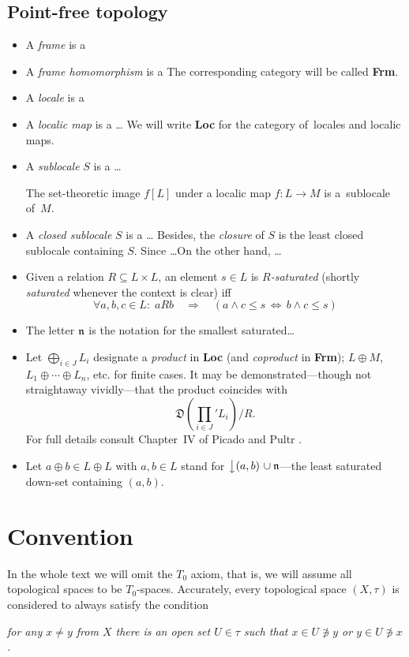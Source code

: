 \subsection*{Point-free topology}

\begin{itemize}
\item A \emph{frame} is a
\item A \emph{frame homomorphism} is a
The corresponding category will be called {\bf Frm}.
\item A \emph{locale} is a
\item A \emph{localic map} is a \ldots
We will write {\bf Loc} for the category of~locales and localic maps.
\item A \emph{sublocale} $S$ is a \ldots
  \begin{fact}
    The set-theoretic image $f[L]$ under a localic map $f\colon L\to M$
    is a~sublocale of~$M$.
  \end{fact}
\item A \emph{closed sublocale} $S$ is a \ldots
Besides, the \emph{closure} of $S$ is the least closed sublocale containing $S$.
Since \ldots On the other hand, \ldots
\item Given a relation $R\subseteq L \times L$, an element $s\in L$ is
\emph{$R$-saturated} (shortly \emph{saturated} whenever the context is clear)
  iff
\[
  \forall a, b, c\in L: \; aRb \quad \Rightarrow \quad \left( a \wedge c \leq s
  \, \Leftrightarrow \, b \wedge c \leq s \right)
\]
\item The letter $\mathfrak{n}$ is the notation for the smallest saturated\ldots
\item Let $\bigoplus_{i\in J} L_i$ designate a \emph{product} in {\bf Loc} (and
\emph{coproduct} in {\bf Frm}); $L \oplus M$, $L_1 \oplus\cdots\oplus L_n$, etc.
for finite cases.
It may be demonstrated---though not straightaway vividly---that the product
coincides with
\[
  \textstyle\mathfrak{D}\left(\prod_{i\in J}\nolimits' L_{i}\right)/R.
\]
For full details consult Chapter~IV of Picado and Pultr \cite{picado-pultr12}.
\item Let $a \oplus b \in L \oplus L$ with $a, b\in L$ stand for
$\left\downarrow (a, b) \right. \cup \mathfrak{n}$---the least saturated down-set
containing $(a, b)$.
\end{itemize}

\section*{Convention}

In the whole text we will omit the $T_0$ axiom, that is, we will assume all
topological spaces to be $T_0$-spaces.
Accurately, every topological space $(X, \tau)$ is considered to always satisfy
the condition
\begin{center} \it
  for any $x \ne y$ from $X$ there is an open set $U \in \tau$ such that $x \in U
  \not\owns y$ or $y \in U \not\owns x$.
\end{center}

